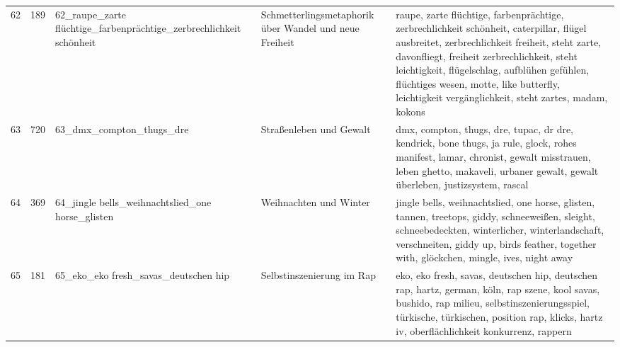 \begin{longtable}{rrlll}
62 & 189 & 62\_raupe\_zarte flüchtige\_farbenprächtige\_zerbrechlichkeit schönheit & Schmetterlingsmetaphorik über Wandel und neue Freiheit & raupe, zarte flüchtige, farbenprächtige, zerbrechlichkeit schönheit, caterpillar, flügel ausbreitet, zerbrechlichkeit freiheit, steht zarte, davonfliegt, freiheit zerbrechlichkeit, steht leichtigkeit, flügelschlag, aufblühen gefühlen, flüchtiges wesen, motte, like butterfly, leichtigkeit vergänglichkeit, steht zartes, madam, kokons \\
63 & 720 & 63\_dmx\_compton\_thugs\_dre & Straßenleben und Gewalt & dmx, compton, thugs, dre, tupac, dr dre, kendrick, bone thugs, ja rule, glock, rohes manifest, lamar, chronist, gewalt misstrauen, leben ghetto, makaveli, urbaner gewalt, gewalt überleben, justizsystem, rascal \\
64 & 369 & 64\_jingle bells\_weihnachtslied\_one horse\_glisten & Weihnachten und Winter & jingle bells, weihnachtslied, one horse, glisten, tannen, treetops, giddy, schneeweißen, sleight, schneebedeckten, winterlicher, winterlandschaft, verschneiten, giddy up, birds feather, together with, glöckchen, mingle, ives, night away \\
65 & 181 & 65\_eko\_eko fresh\_savas\_deutschen hip & Selbstinszenierung im Rap & eko, eko fresh, savas, deutschen hip, deutschen rap, hartz, german, köln, rap szene, kool savas, bushido, rap milieu, selbstinszenierungsspiel, türkische, türkischen, position rap, klicks, hartz iv, oberflächlichkeit konkurrenz, rappern \\
\end{longtable}
